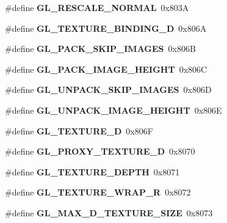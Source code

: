 \begin{DoxyCompactItemize}
\item 
\#define {\bfseries G\+L\+\_\+\+R\+E\+S\+C\+A\+L\+E\+\_\+\+N\+O\+R\+M\+A\+L}~0x803\+A\label{_s_d_l__opengl_8h_a26be8568349f16a356797abb59af0c7b}

\item 
\#define {\bfseries G\+L\+\_\+\+T\+E\+X\+T\+U\+R\+E\+\_\+\+B\+I\+N\+D\+I\+N\+G\+\_\+D}~0x806\+A\label{_s_d_l__opengl_8h_ac898949a7c8e1d67dd6b1910de1b808c}

\item 
\#define {\bfseries G\+L\+\_\+\+P\+A\+C\+K\+\_\+\+S\+K\+I\+P\+\_\+\+I\+M\+A\+G\+E\+S}~0x806\+B\label{_s_d_l__opengl_8h_a1ebbcabd1c72d2bee103207ff35e471f}

\item 
\#define {\bfseries G\+L\+\_\+\+P\+A\+C\+K\+\_\+\+I\+M\+A\+G\+E\+\_\+\+H\+E\+I\+G\+H\+T}~0x806\+C\label{_s_d_l__opengl_8h_a38a7218f9071810d5aa631da23d6ae89}

\item 
\#define {\bfseries G\+L\+\_\+\+U\+N\+P\+A\+C\+K\+\_\+\+S\+K\+I\+P\+\_\+\+I\+M\+A\+G\+E\+S}~0x806\+D\label{_s_d_l__opengl_8h_a631a0e701301001433205a1c5ba9a4f9}

\item 
\#define {\bfseries G\+L\+\_\+\+U\+N\+P\+A\+C\+K\+\_\+\+I\+M\+A\+G\+E\+\_\+\+H\+E\+I\+G\+H\+T}~0x806\+E\label{_s_d_l__opengl_8h_aa1e6adc033f5df7d4dbf160b5ee0e093}

\item 
\#define {\bfseries G\+L\+\_\+\+T\+E\+X\+T\+U\+R\+E\+\_\+D}~0x806\+F\label{_s_d_l__opengl_8h_a6c865f303c89ec764158e0016e50d4a8}

\item 
\#define {\bfseries G\+L\+\_\+\+P\+R\+O\+X\+Y\+\_\+\+T\+E\+X\+T\+U\+R\+E\+\_\+D}~0x8070\label{_s_d_l__opengl_8h_a1660ed6ba07c342ff4ac182374d48b74}

\item 
\#define {\bfseries G\+L\+\_\+\+T\+E\+X\+T\+U\+R\+E\+\_\+\+D\+E\+P\+T\+H}~0x8071\label{_s_d_l__opengl_8h_a8177de06943e9e08b6f69767c8c18b06}

\item 
\#define {\bfseries G\+L\+\_\+\+T\+E\+X\+T\+U\+R\+E\+\_\+\+W\+R\+A\+P\+\_\+\+R}~0x8072\label{_s_d_l__opengl_8h_a1b69ad7ea841f21165a25e58411b6bab}

\item 
\#define {\bfseries G\+L\+\_\+\+M\+A\+X\+\_\+D\+\_\+\+T\+E\+X\+T\+U\+R\+E\+\_\+\+S\+I\+Z\+E}~0x8073\label{_s_d_l__opengl_8h_a9eb2f6fcd1311d528057b82ea84ad75f}


\end{DoxyCompactItemize}
